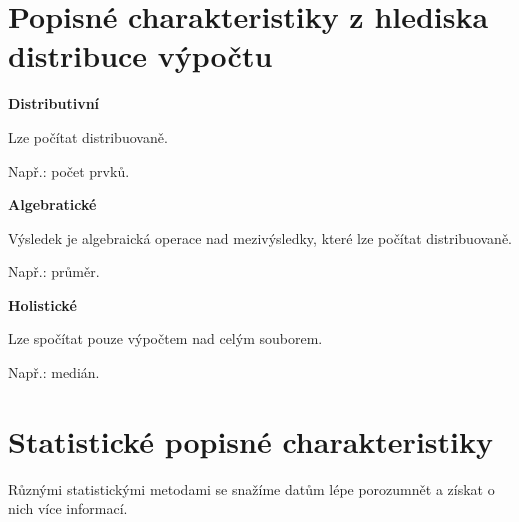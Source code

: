
\section{Popisné charakteristiky z hlediska distribuce výpočtu}

\begin{compactitem}
    \item \textbf{Distributivní} \begin{compactitem}
        \item Lze počítat distribuovaně.
        \item Např.: počet prvků.
    \end{compactitem}

    \item \textbf{Algebratické} \begin{compactitem}
        \item Výsledek je algebraická operace nad mezivýsledky, které lze počítat distribuovaně.
        \item Např.: průměr.
    \end{compactitem}

    \item \textbf{Holistické} \begin{compactitem}
        \item Lze spočítat pouze výpočtem nad celým souborem.
        \item Např.: medián.
    \end{compactitem}
\end{compactitem}


\section{Statistické popisné charakteristiky}

\begin{compactitem}
    \item Různými statistickými metodami se snažíme datům lépe porozumnět a získat o nich více informací.
\end{compactitem}

